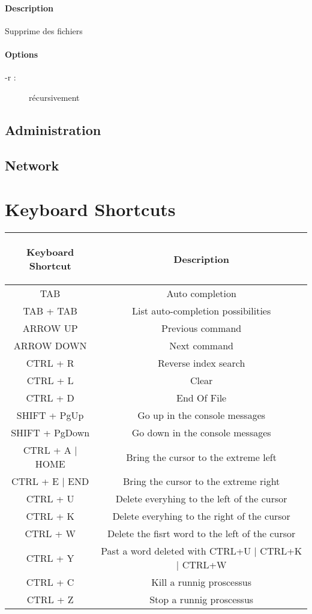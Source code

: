 \documentclass[a4paper, 10pt, onecolumn, openright, oneside]{book}
\begin{document}
\subsection{Description}
Supprime des fichiers
\subsection{Options}
\begin{description}
\item[-r :] récursivement
\end{description}


\chapter{Administration}

\chapter{Network}

\part{Keyboard Shortcuts}

\begin{center}
\begin{tabular}{|c|c|}
\hline
\begin{bf}Keyboard Shortcut\end{bf} & \begin{bf}Description\end{bf} \\
\hline
TAB & Auto completion \\
TAB + TAB & List auto-completion possibilities \\
ARROW UP & Previous command \\
ARROW DOWN & Next command \\
CTRL + R & Reverse index search \\
CTRL + L & Clear \\
CTRL + D & End Of File \\
SHIFT + PgUp & Go up in the console messages \\
SHIFT + PgDown & Go down in the console messages \\
CTRL + A $\vert$ HOME & Bring the cursor to the extreme left \\
CTRL + E $\vert$ END & Bring the cursor to the extreme right \\
CTRL + U & Delete everyhing to the left of the cursor \\
CTRL + K & Delete everyhing to the right of the cursor \\
CTRL + W & Delete the fisrt word to the left of the cursor \\
CTRL + Y & Past a word deleted with CTRL+U $\vert$ CTRL+K $\vert$ CTRL+W \\
CTRL + C & Kill a runnig proscessus \\
CTRL + Z & Stop a runnig proscessus \\
\hline
\end{tabular}
\end{center}
\end{document}
